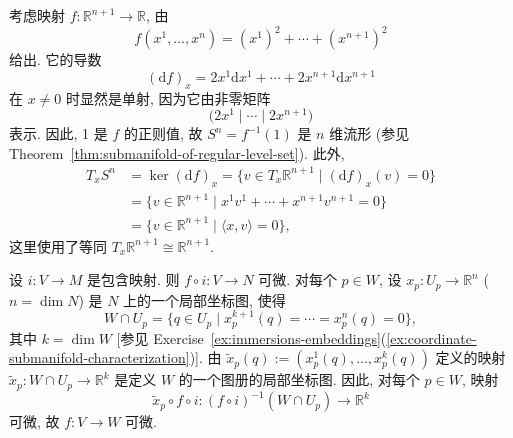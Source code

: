 \begin{description}[font=\normalfont,leftmargin=2em,labelwidth=1.5em]
考虑映射 $f:\mathbb{R}^{n+1}\to\mathbb{R}$, 由
\[
  f(x^1,\ldots,x^n)=(x^1)^2+\cdots+(x^{n+1})^2
\]
给出. 它的导数
\[
  (\mathrm{d}f)_x=2x^1\mathrm{d}x^1+\cdots+2x^{n+1}\mathrm{d}x^{n+1}
\]
在 $x\ne0$ 时显然是单射, 因为它由非零矩阵
\[
  \bigl(2x^1\mid\cdots\mid 2x^{n+1}\bigr)
\]
表示. 因此, 1 是 $f$ 的正则值, 故 $S^n=f^{-1}(1)$ 是 $n$ 维流形 (参见 Theorem~\ref{thm:submanifold-of-regular-level-set}). 此外,
\begin{align*}
  T_xS^n&=\ker(\mathrm{d}f)_x
  =\{v\in T_x\mathbb{R}^{n+1}\mid(\mathrm{d}f)_x(v)=0\}\\
  &=\{v\in\mathbb{R}^{n+1}\mid x^1v^1+\cdots+x^{n+1}v^{n+1}=0\}\\
  &=\{v\in\mathbb{R}^{n+1}\mid\langle x,v\rangle=0\},
\end{align*}
这里使用了等同 $T_x\mathbb{R}^{n+1}\cong\mathbb{R}^{n+1}$.

设 $i:V\to M$ 是包含映射. 则 $f\circ i:V\to N$ 可微. 对每个 $p\in W$, 设 $x_p:U_p\to\mathbb{R}^n$ ($n=\dim N$) 是 $N$ 上的一个局部坐标图, 使得
\[
  W\cap U_p=\{q\in U_p\mid x_p^{k+1}(q)=\cdots=x_p^n(q)=0\},
\]
其中 $k=\dim W$ [参见 Exercise~\ref{ex:immersions-embeddings}(\ref{ex:coordinate-submanifold-characterization})]. 由 $\widetilde x_p(q):=(x_p^1(q),\ldots,x_p^k(q))$ 定义的映射 $\widetilde x_p:W\cap U_p\to\mathbb{R}^k$ 是定义 $W$ 的一个图册的局部坐标图. 因此, 对每个 $p\in W$, 映射
\[
  \widetilde x_p\circ f\circ i:(f\circ i)^{-1}(W\cap U_p)\to\mathbb{R}^k
\]
可微, 故 $f:V\to W$ 可微.
\end{description}
